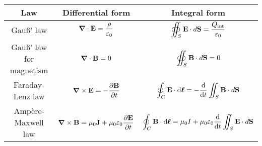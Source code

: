 \documentclass[../../../main.tex]{subfiles}
\begin{document}
\begin{table}[ht]
    \centering
    \renewcommand{\arraystretch}{2.5}
    \begin{tabular}{|c|c|c|}
        \hline
        \bfseries Law             & \bfseries Differential form                                                                                                                            & \bfseries Integral form                                                                                                                           \\
        \hline
        Gau\ss' law               & $\displaystyle \boldsymbol{\mathrm{\grad}}\cdot\boldsymbol{\mathrm{E}}=\frac{\rho}{\varepsilon_0}$                                                               & $\displaystyle \oiint_S\boldsymbol{\mathrm{E}}\cdot d\boldsymbol{\mathrm{S}}=\frac{Q_{\text{int}}}{\varepsilon_0}$                                          \\
        \hline
        Gau\ss' law for magnetism & $\displaystyle \boldsymbol{\mathrm{\grad}}\cdot\boldsymbol{\mathrm{B}}=0$                                                                                        & $\displaystyle \oiint_S\boldsymbol{\mathrm{B}}\cdot d\boldsymbol{\mathrm{S}}=0$                                                                             \\
        \hline
        Faraday-Lenz law          & $\displaystyle \boldsymbol{\mathrm{\grad}}\times\boldsymbol{\mathrm{E}}=-\frac{\partial\boldsymbol{\mathrm{B}}}{\partial t}$                                          & $\displaystyle \oint_C\boldsymbol{\mathrm{E}}\cdot \dd\vb*{\ell}=-\dv{}{t}\iint_S\boldsymbol{\mathrm{B}}\cdot d\boldsymbol{\mathrm{S}}$                          \\
        \hline
        Ampère-Maxwell law        & $\displaystyle \boldsymbol{\mathrm{\grad}}\times\boldsymbol{\mathrm{B}}=\mu_0\boldsymbol{\mathrm{J}}+\mu_0\varepsilon_0\frac{\partial\boldsymbol{\mathrm{E}}}{\partial t}$ & $\displaystyle \oint_C\boldsymbol{\mathrm{B}}\cdot \dd\vb*{\ell}=\mu_0 I+\mu_0\varepsilon_0\dv{}{t}\iint_S\boldsymbol{\mathrm{E}}\cdot d\boldsymbol{\mathrm{S}}$ \\
        \hline
    \end{tabular}
\end{table}
\end{document}
